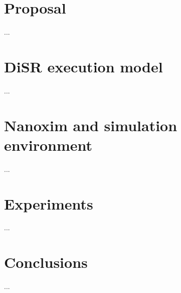 \documentclass[conference]{IEEEtran}
\begin{document}
\section{Proposal}
...

\section{DiSR execution model}
...


\section{Nanoxim and simulation environment}
...


\section{Experiments}
...


\section{Conclusions}
...


\balance

 


\end{document}
